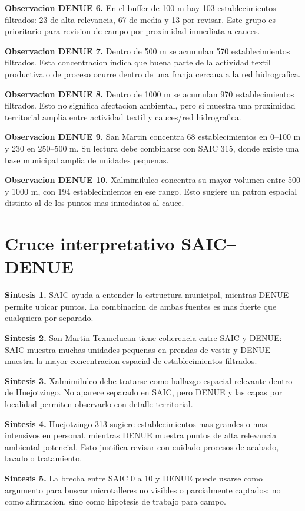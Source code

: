 \documentclass[11pt,letterpaper]{article}
\begin{document}
\textbf{Observacion DENUE 6.} En el buffer de 100 m hay 103 establecimientos filtrados: 23 de alta relevancia, 67 de media y 13 por revisar. Este grupo es prioritario para revision de campo por proximidad inmediata a cauces.

\textbf{Observacion DENUE 7.} Dentro de 500 m se acumulan 570 establecimientos filtrados. Esta concentracion indica que buena parte de la actividad textil productiva o de proceso ocurre dentro de una franja cercana a la red hidrografica.

\textbf{Observacion DENUE 8.} Dentro de 1000 m se acumulan 970 establecimientos filtrados. Esto no significa afectacion ambiental, pero si muestra una proximidad territorial amplia entre actividad textil y cauces/red hidrografica.

\textbf{Observacion DENUE 9.} San Martin concentra 68 establecimientos en 0--100 m y 230 en 250--500 m. Su lectura debe combinarse con SAIC 315, donde existe una base municipal amplia de unidades pequenas.

\textbf{Observacion DENUE 10.} Xalmimilulco concentra su mayor volumen entre 500 y 1000 m, con 194 establecimientos en ese rango. Esto sugiere un patron espacial distinto al de los puntos mas inmediatos al cauce.

\section{Cruce interpretativo SAIC--DENUE}

\textbf{Sintesis 1.} SAIC ayuda a entender la estructura municipal, mientras DENUE permite ubicar puntos. La combinacion de ambas fuentes es mas fuerte que cualquiera por separado.

\textbf{Sintesis 2.} San Martin Texmelucan tiene coherencia entre SAIC y DENUE: SAIC muestra muchas unidades pequenas en prendas de vestir y DENUE muestra la mayor concentracion espacial de establecimientos filtrados.

\textbf{Sintesis 3.} Xalmimilulco debe tratarse como hallazgo espacial relevante dentro de Huejotzingo. No aparece separado en SAIC, pero DENUE y las capas por localidad permiten observarlo con detalle territorial.

\textbf{Sintesis 4.} Huejotzingo 313 sugiere establecimientos mas grandes o mas intensivos en personal, mientras DENUE muestra puntos de alta relevancia ambiental potencial. Esto justifica revisar con cuidado procesos de acabado, lavado o tratamiento.

\textbf{Sintesis 5.} La brecha entre SAIC 0 a 10 y DENUE puede usarse como argumento para buscar microtalleres no visibles o parcialmente captados: no como afirmacion, sino como hipotesis de trabajo para campo.
\end{document}
